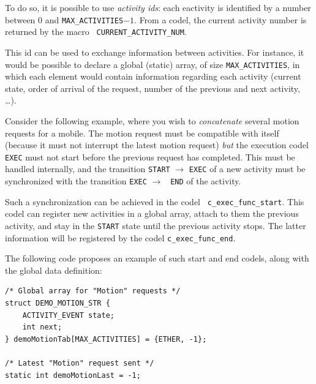 To  do so, it is  possible to use {\em  activity  ids}: each eactivity is
identified by a number between  $0$ and {\tt MAX\_ACTIVITIES}$-1$. From a
codel,   the current  activity number  is    returned by the  macro  {\tt
CURRENT\_ACTIVITY\_NUM}.

This  id can be  used  to exchange   information between activities.  For
instance, it would  be possible to  declare  a global (static) array,  of
size {\tt  MAX\_ACTIVITIES},    in which   each  element   would  contain
information regarding each activity  (current state, order of  arrival of
the request, number of the previous and next activity, \ldots).

Consider  the following  example,  where  you wish  to {\em  concatenate}
several motion  requests  for a   mobile.  The  motion  request  must  be
compatible with  itself (because it must not  interrupt the latest motion
request)  {\em but} the execution codel  {\tt EXEC} must not start before
the previous request has completed.  This must be handled internally, and
the  transition {\tt START}  $\rightarrow$  {\tt EXEC}  of a new activity
must be  synchronized with the  transition {\tt  EXEC} $\rightarrow$ {\tt
END} of the activity.

Such  a  synchronization     can  be  achieved   in     the   codel  {\tt
c\_exec\_func\_start}. This codel can register new activities in a global
array, attach to them the previous activity, and  stay in the {\tt START}
state  until the previous activity  stops. The latter information will be
registered by the codel {\tt c\_exec\_func\_end}.

The following  code  proposes an  example of such   start and end codels,
along with the global data definition:


\begin{center}\begin{cartouche}\small\begin{verbatim}
/* Global array for "Motion" requests */
struct DEMO_MOTION_STR {
    ACTIVITY_EVENT state;
    int next;
} demoMotionTab[MAX_ACTIVITIES] = {ETHER, -1};

/* Latest "Motion" request sent */
static int demoMotionLast = -1; 
\end{verbatim}\end{cartouche}\end{center}

